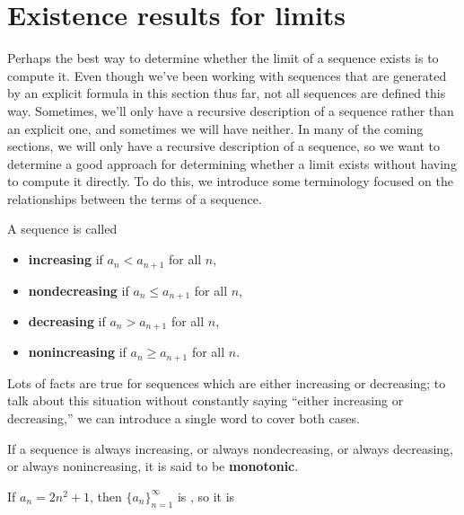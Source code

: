 \documentclass{ximera}
\begin{document}
\section{Existence results for limits}

Perhaps the best way to determine whether the limit of a sequence exists is to compute it.  Even though we've been working with sequences that are generated by an explicit formula in this section thus far, not all sequences are defined this way.  Sometimes, we'll only have a recursive description of a sequence rather than an explicit one, and sometimes we will have neither.  In many of the coming sections, we will only have a recursive description of a sequence, so we want to determine a good approach for determining whether a limit exists without having to compute it directly.  To do this, we introduce some terminology focused on the relationships between the terms of a sequence.

\begin{definition}
  A sequence is called
  \begin{itemize}
    \item \textbf{increasing} if $a_n<a_{n+1}$ for all $n$,
    \item \textbf{nondecreasing} if $a_n\le a_{n+1}$ for all $n$,
    \item \textbf{decreasing} if $a_n>a_{n+1}$ for all $n$,
    \item \textbf{nonincreasing} if $a_n\ge a_{n+1}$ for all $n$.
  \end{itemize}
\end{definition}

Lots of facts are true for sequences which are either increasing or
decreasing; to talk about this situation without constantly saying
``either increasing or decreasing,'' we can introduce a single word to
cover both cases.
\begin{definition}
  If a sequence is always increasing, or  always nondecreasing, or always decreasing, or always nonincreasing, it is said to be \textbf{monotonic}.
\end{definition}


\begin{example}
If $a_n = 2n^2+1$, then $\{a_n\}_{n=1}^{\infty}$ is , so it is
\end{example}
\end{document}

